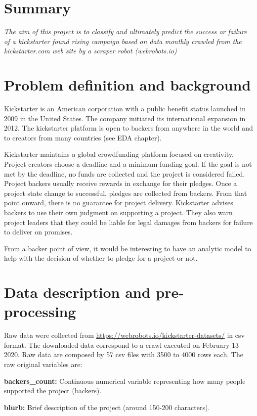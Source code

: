 \documentclass[10pt,english, openany]{book}
\begin{document}
\chapter{Summary}\label{chapt:sum}
\textit{The aim of this project is to classify and ultimately predict the success or failure of a kickstarter found rising campaign based on data monthly crawled from the kickstarter.com web site by a scraper robot (webrobots.io)}
\chapter{Problem definition and background}
{Kickstarter is an American corporation with a public benefit status launched in 2009 in the United States. The company initiated its international expansion in 2012. The kickstarter platform is open to backers from anywhere in the world and to creators from many countries (see EDA chapter).

Kickstarter maintains a global crowdfunding platform focused on creativity. Project creators choose a deadline and a minimum funding goal. If the goal is not met by the deadline, no funds are collected and the project is considered failed. Project backers usually receive rewards in exchange for their pledges.
Once a project state change to successful, pledges are collected from backers. From that point onward, there is no guarantee for project delivery. Kickstarter advises backers to use their own judgment on supporting a project. They also warn project leaders that they could be liable for legal damages from backers for failure to deliver on promises.

From a backer point of view, it would be interesting to have an analytic model to help with the decision of whether to pledge for a project or not.
}
\chapter{Data description and pre-processing}

Raw data were collected from \url{https://webrobots.io/kickstarter-datasets/} in csv format.  The downloaded data correspond to a crawl executed on February 13 2020. Raw data are composed by 57 csv files with 3500 to 4000 rows each. The raw original variables are:

\textbf{backers\_count:} Continuous numerical variable representing how many people supported the project (backers).

\textbf{blurb:} Brief description of the project (around 150-200 characters).
\end{document}
